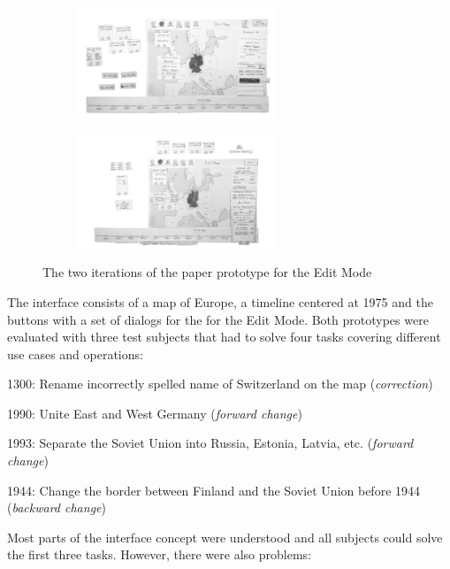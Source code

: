 \begin{figure}[H]
\centering
\begin{subfigure}{.5\textwidth}
  \centering
  \includegraphics[width=225px]{graphics/development/user_interface_design_process/paper_prototype_1.png}
\end{subfigure}%
\begin{subfigure}{.5\textwidth}
  \centering
  \includegraphics[width=225px]{graphics/development/user_interface_design_process/paper_prototype_2.png}
\end{subfigure}
\caption{The two iterations of the paper prototype for the Edit Mode}
\label{fig:paper_prototypes}
\end{figure}

The interface consists of a map of Europe, a timeline centered at 1975 and the buttons with a set of dialogs for the for the Edit Mode. Both prototypes were evaluated with three test subjects that had to solve four tasks covering different use cases and operations:
\begin{compactenum}
  \item 1300: Rename incorrectly spelled name of Switzerland on the map (\emph{correction})
  \item 1990: Unite East and West Germany (\emph{forward change})
  \item 1993: Separate the Soviet Union into Russia, Estonia, Latvia, etc. (\emph{forward change})
  \item 1944: Change the border between Finland and the Soviet Union before 1944 (\emph{backward change})
\end{compactenum}

Most parts of the interface concept were understood and all subjects could solve the first three tasks. However, there were also problems:

